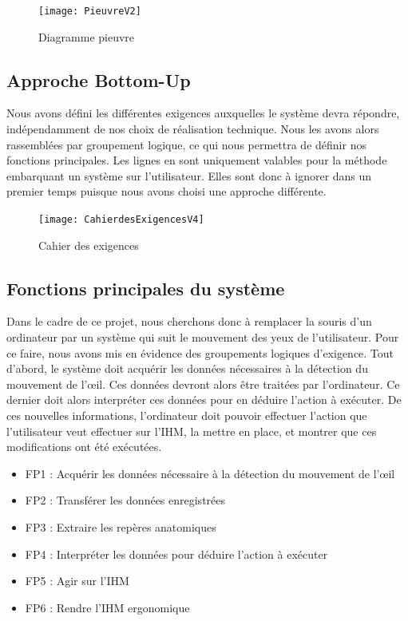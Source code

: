 \begin{figure}[H]
  \centering
  \texttt{[image: PieuvreV2]}
  \caption{Diagramme pieuvre}
  \label{fig:pieuvre}
\end{figure}

\subsection{Approche Bottom-Up}
Nous avons défini les différentes exigences auxquelles le système devra répondre, indépendamment de nos choix de réalisation technique. Nous les avons alors rassemblées par groupement logique, ce qui nous permettra de définir nos fonctions principales. Les lignes en {\color{sable}{\rule{0.5cm}{0.25cm}}} sont uniquement valables pour la méthode embarquant un système sur l'utilisateur. Elles sont donc à ignorer dans un premier temps puisque nous avons choisi une approche différente. 

\begin{figure}[H]
  \centering
  \texttt{[image: CahierdesExigencesV4]}
  \caption{Cahier des exigences}
  \label{fig:exigences}
\end{figure}

\subsection{Fonctions principales du système}

Dans le cadre de ce projet, nous cherchons donc à remplacer la souris d'un ordinateur par un système qui suit le mouvement des yeux de l'utilisateur. Pour ce faire, nous avons mis en évidence des groupements logiques d'exigence. Tout d'abord, le système doit acquérir les données nécessaires à la détection du mouvement de l'œil. Ces données devront alors être traitées par l'ordinateur. Ce dernier doit alors interpréter ces données pour en déduire l'action à exécuter. De ces nouvelles informations, l'ordinateur doit pouvoir effectuer l'action que l'utilisateur veut effectuer sur l'IHM, la mettre en place, et montrer que ces modifications ont été exécutées. 

\begin{itemize}[label=\textbullet,font=\color{black}]
\item FP1 : Acquérir les données nécessaire à la détection du mouvement de l'œil 
\item\colorbox{sable}{FP2 : Transférer les données enregistrées}
\item FP3 : Extraire les repères anatomiques
\item FP4 : Interpréter les données pour déduire l'action à exécuter 
\item FP5 : Agir sur l'IHM
\item FP6 : Rendre l'IHM ergonomique
\end{itemize}

